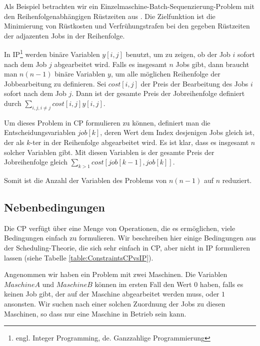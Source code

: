 Als Beispiel betrachten wir ein Einzelmaschine-Batch-Sequenzierung-Problem mit den Reihenfolgenabhängigen Rüstzeiten aus \cite{Jordan}. Die Zielfunktion ist die Minimierung von Rüstkosten und Verfrühungstrafen bei den gegeben Rüstzeiten der adjazenten Jobs in der Reihenfolge.

In IP\footnote{engl. Integer Programming, de. Ganzzahlige Programmierung} werden binäre Variablen $y[i,j]$ benutzt, um zu zeigen, ob der Job $i$ sofort nach dem Job $j$ abgearbeitet wird. Falls es insgesamt $n$ Jobs gibt, dann braucht man $n(n-1)$ binäre Variablen $y$, um alle möglichen Reihenfolge der Jobbearbeitung zu definieren. Sei $cost[i,j]$ der Preis der Bearbeitung des Jobs $i$ sofort nach dem Job $j$. Dann ist der gesamte Preis der Jobreihenfolge definiert durch $\sum_{i,j,i\not =  j} {cost[i,j]y[i,j]}$.

Um dieses Problem in CP formulieren zu können, definiert man die Entscheidungsvariablen $job[k]$, deren Wert dem Index desjenigen Jobs gleich ist, der als $k$-ter in der Reihenfolge abgearbeitet wird. Es ist klar, dass es insgesamt $n$ solcher Variablen gibt. Mit diesen Variablen is der gesamte Preis der Jobreihenfolge gleich $\sum_{k>1} {cost[job[k-1],job[k]]}$.

Somit ist die Anzahl der Variablen des Problems von $n(n-1)$ auf $n$ reduziert.

\subsection{Nebenbedingungen}

Die CP verfügt über eine Menge von Operationen, die es ermöglichen, viele Bedingungen einfach zu formulieren. Wir beschreiben hier einige Bedingungen aus der Scheduling-Theorie, die sich sehr einfach in CP, aber nicht in IP formulieren lassen (siehe Tabelle \ref{table:ConstraintsCPvsIP}).

Angenommen wir haben ein Problem mit zwei Maschinen. Die Variablen $MaschineA$ und $MaschineB$ können im ersten Fall den Wert $0$ haben, falls es keinen Job gibt, der auf der Maschine abgearbeitet werden muss, oder $1$ ansonsten. Wir suchen nach einer solchen Zuordnung der Jobs zu diesen Maschinen, so dass nur eine Maschine in Betrieb sein kann. 

